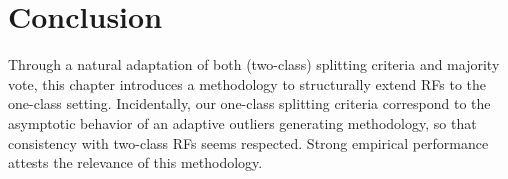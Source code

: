 


\section{Conclusion}
Through a natural adaptation of both (two-class) splitting criteria and majority vote, this chapter introduces a methodology to structurally extend RFs to the one-class setting.
%
Incidentally, our one-class splitting criteria correspond to the asymptotic behavior of an adaptive outliers generating methodology, so that consistency with two-class RFs seems respected.
%
Strong empirical performance attests the relevance of this methodology.


